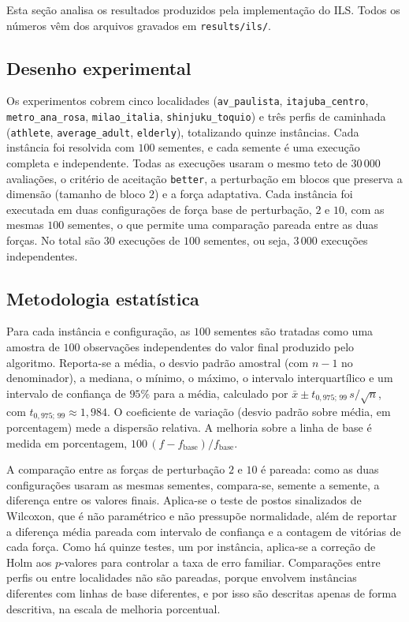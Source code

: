 \documentclass[11pt,a4paper]{article}
\newcommand{\code}[1]{\texttt{#1}}
\begin{document}
Esta seção analisa os resultados produzidos pela implementação do ILS. Todos os números vêm dos arquivos gravados em \code{results/ils/}.

\subsection{Desenho experimental}

Os experimentos cobrem cinco localidades (\code{av\_paulista}, \code{itajuba\_centro}, \code{metro\_ana\_rosa}, \code{milao\_italia}, \code{shinjuku\_toquio}) e três perfis de caminhada (\code{athlete}, \code{average\_adult}, \code{elderly}), totalizando quinze instâncias. Cada instância foi resolvida com $100$ sementes, e cada semente é uma execução completa e independente. Todas as execuções usaram o mesmo teto de $30\,000$ avaliações, o critério de aceitação \code{better}, a perturbação em blocos que preserva a dimensão (tamanho de bloco $2$) e a força adaptativa. Cada instância foi executada em duas configurações de força base de perturbação, $2$ e $10$, com as mesmas $100$ sementes, o que permite uma comparação pareada entre as duas forças. No total são $30$ execuções de $100$ sementes, ou seja, $3\,000$ execuções independentes.

\subsection{Metodologia estatística}

Para cada instância e configuração, as $100$ sementes são tratadas como uma amostra de $100$ observações independentes do valor final produzido pelo algoritmo. Reporta-se a média, o desvio padrão amostral (com $n-1$ no denominador), a mediana, o mínimo, o máximo, o intervalo interquartílico e um intervalo de confiança de $95\%$ para a média, calculado por $\bar{x} \pm t_{0{,}975;\,99}\, s/\sqrt{n}$, com $t_{0{,}975;\,99} \approx 1{,}984$. O coeficiente de variação (desvio padrão sobre média, em porcentagem) mede a dispersão relativa. A melhoria sobre a linha de base é medida em porcentagem, $100\,(f - f_{\text{base}})/f_{\text{base}}$.

A comparação entre as forças de perturbação $2$ e $10$ é pareada: como as duas configurações usaram as mesmas sementes, compara-se, semente a semente, a diferença entre os valores finais. Aplica-se o teste de postos sinalizados de Wilcoxon, que é não paramétrico e não pressupõe normalidade, além de reportar a diferença média pareada com intervalo de confiança e a contagem de vitórias de cada força. Como há quinze testes, um por instância, aplica-se a correção de Holm aos $p$-valores para controlar a taxa de erro familiar. Comparações entre perfis ou entre localidades não são pareadas, porque envolvem instâncias diferentes com linhas de base diferentes, e por isso são descritas apenas de forma descritiva, na escala de melhoria porcentual.
\end{document}
